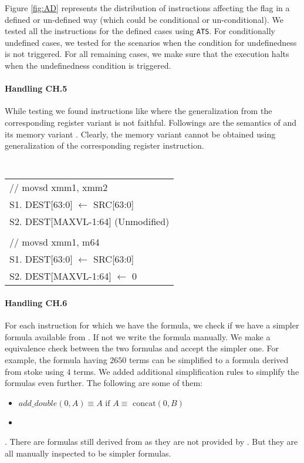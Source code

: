    Figure \ref{fig:AD} represents the distribution of instructions affecting the
    flag in a defined or un-defined way (which could be conditional or
       un-conditional).  We tested all the instructions for the defined cases
   using {\tt ATS}. For conditionally undefined cases, we tested for the
   scenarios when the condition for undefinedness is not triggered.  For all
   remaining cases,  we make sure that the \K execution halts when the
   undefinedness condition is triggered.        
   
   \paragraph{Handling CH.5}
   
   While testing we found instructions like 
   where the generalization from the corresponding register variant is not
   faithful. Followings are the semantics of  and its
   memory variant  . Clearly, the memory variant cannot
   be obtained using generalization of the  corresponding register instruction.   
   
   {\small \tt 
       \centering
       \begin{tabular}[b]{l}
           // movsd xmm1, xmm2 \\
           S1. DEST[63:0] $\leftarrow$ SRC[63:0] \\ 
           S2. DEST[MAXVL-1:64] (Unmodified) \\
           \\
           // movsd xmm1, m64 \\
           S1. DEST[63:0] $\leftarrow$ SRC[63:0] \\
           S2. DEST[MAXVL-1:64] $\leftarrow$ 0 \\
       \end{tabular}
   }

   \paragraph{Handling CH.6}
        For each instruction for which we have the \Strata formula, we check if we have a simpler formula available from \Stoke. If not we write the formula manually. We make a equivalence check between the two formulas and accept the simpler one. For example, the \Strata formula  having $2650$ terms can be simplified to a formula derived from stoke using $4$ terms.
         We added additional simplification rules to simplify the formulas even further. The following are some of them:
        \begin{itemize}
            \item $add\_double(0, A)  \equiv  A  \text{ if } A\equiv \text{ concat}(0, B)$  
            \item {} 
        \end{itemize}
        . There are  formulas still derived from \Strata as they are not provided by \Stoke. But they are all manually inspected to be simpler formulas.

